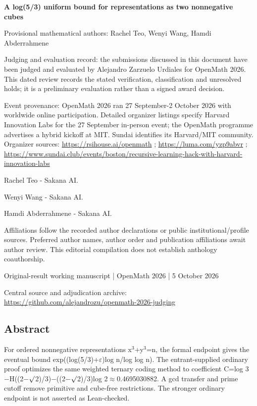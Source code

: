 \documentclass[11pt,a4paper]{article}
\begin{document}
{\LARGE\bfseries A log(5/3) uniform bound for representations as two nonnegative cubes\par}\medskip
{\small Provisional mathematical authors: Rachel Teo, Wenyi Wang, Hamdi Abderrahmene\par}\medskip
{\small Judging and evaluation record: the submissions discussed in this document have been judged and evaluated by Alejandro Zarzuelo Urdiales for OpenMath 2026. This dated review records the stated verification, classification and unresolved holds; it is a preliminary evaluation rather than a signed award decision.\par}

{\small Event provenance: OpenMath 2026 ran 27 September-2 October 2026 with worldwide online participation. Detailed organizer listings specify Harvard Innovation Labs for the 27 September in-person event; the OpenMath programme advertises a hybrid kickoff at MIT. Sundai identifies its Harvard/MIT community. Organizer sources: \url{https://rsihouse.ai/openmath} ; \url{https://luma.com/yzp9abvr} ; \url{https://www.sundai.club/events/boston/recursive-learning-hack-with-harvard-innovation-labs}\par}

{\small Rachel Teo  -  Sakana AI.\par}

{\small Wenyi Wang  -  Sakana AI.\par}

{\small Hamdi Abderrahmene  -  Sakana AI.\par}

{\small Affiliations follow the recorded author declarations or public institutional/profile sources. Preferred author names, author order and publication affiliations await author review. This editorial compilation does not establish anthology coauthorship.\par}

{\small Original-result working manuscript | OpenMath 2026 | 5 October 2026\par}\medskip
{\small Central source and adjudication archive: \url{https://github.com/alejandrozu/openmath-2026-judging}\par}

\subsection{Abstract}
For ordered nonnegative representations x\ensuremath{^3}+y\ensuremath{^3}=n, the formal endpoint gives the eventual bound exp((log(5/3)+\ensuremath{\varepsilon})log n/log log n). The entrant-supplied ordinary proof optimizes the same weighted ternary coding method to coefficient C=log 3\ensuremath{-}H((2\ensuremath{-}\ensuremath{\surd}2)/3)\ensuremath{-}((2\ensuremath{-}\ensuremath{\surd}2)/3)log 2\ensuremath{\approx}0.4695030882. A gcd transfer and prime cutoff remove primitive and cube-free restrictions. The stronger ordinary endpoint is not asserted as Lean-checked.
\end{document}
